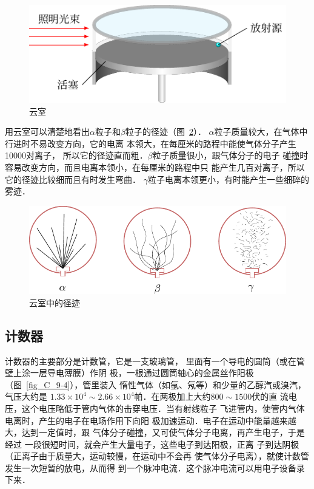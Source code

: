 \begin{figure}[htbp]
	\centering
	\includegraphics{fig/C/9-2.pdf}
	\caption{云室}\label{fig_C_9-2}
\end{figure}

用云室可以清楚地看出$\alpha$粒子和$\beta$粒子的径迹（图~\ref{fig_C_9-3}）．
$\alpha$粒子质量较大，在气体中行进时不易改变方向，它的电离
本领大，在每厘米的路程中能使气体分子产生10000对离子，
所以它的径迹直而粗．$\beta$粒子质量很小，跟气体分子的电子
碰撞时容易改变方向，而且电离本领小，在每厘米的路程中只
能产生几百对离子，所以它的径迹比较细而且有时发生弯曲．
$\gamma$粒子电离本领更小，有时能产生一些细碎的雾迹．

\begin{figure}[htbp]
	\centering
	\centering
	\includegraphics{fig/C/9-3.pdf}
	\caption{云室中的径迹}\label{fig_C_9-3}
\end{figure}

\subsection{计数器}


计数器的主要部分是计数管，它是一支玻璃管，
里面有一个导电的圆筒（或在管壁上涂一层导电薄膜）作阴
极，一根通过圆筒轴心的金属丝作阳极（图~\ref{fig_C_9-4}），管里装入
惰性气体（如氩、氖等）和少量的乙醇汽或溴汽，气压大约是
$1.33\times10^4 \sim 2.66\times10^4$帕．在两极加上大约$800 \sim 1500$伏的直
流电压，这个电压略低于管内气体的击穿电压．当有射线粒子
飞进管内，使管内气体电离时，产生的电子在电场作用下向阳
极加速运动．电子在运动中能量越来越大，达到一定值时，跟
气体分子碰撞，又可使气体分子电离，再产生电子，于是经过
一段很短时间，就会产生大量电子，这些电子到达阳极，正离
子到达阴极（正离子由于质量大，运动较慢，在运动中不会再
使气体分子电离），就使计数管发生一次短暂的放电，从而得
到一个脉冲电流．这个脉冲电流可以用电子设备录下来．

